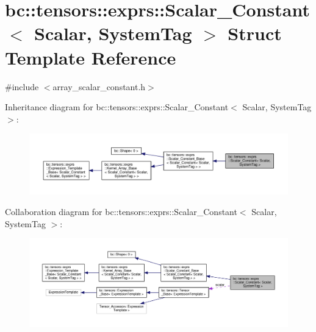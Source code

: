 \hypertarget{structbc_1_1tensors_1_1exprs_1_1Scalar__Constant}{}\section{bc\+:\+:tensors\+:\+:exprs\+:\+:Scalar\+\_\+\+Constant$<$ Scalar, System\+Tag $>$ Struct Template Reference}
\label{structbc_1_1tensors_1_1exprs_1_1Scalar__Constant}


{\ttfamily \#include $<$array\+\_\+scalar\+\_\+constant.\+h$>$}



Inheritance diagram for bc\+:\+:tensors\+:\+:exprs\+:\+:Scalar\+\_\+\+Constant$<$ Scalar, System\+Tag $>$\+:\nopagebreak
\begin{figure}[H]
\begin{center}
\leavevmode
\includegraphics[width=350pt]{structbc_1_1tensors_1_1exprs_1_1Scalar__Constant__inherit__graph}
\end{center}
\end{figure}


Collaboration diagram for bc\+:\+:tensors\+:\+:exprs\+:\+:Scalar\+\_\+\+Constant$<$ Scalar, System\+Tag $>$\+:\nopagebreak
\begin{figure}[H]
\begin{center}
\leavevmode
\includegraphics[width=350pt]{structbc_1_1tensors_1_1exprs_1_1Scalar__Constant__coll__graph}
\end{center}
\end{figure}
